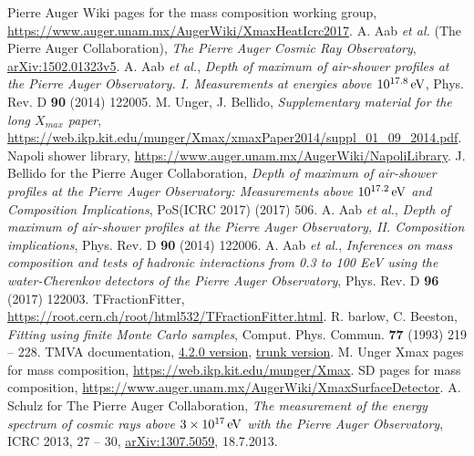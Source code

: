 \documentclass[12pt,a4paper]{report}
\begin{document}
\pagebreak
\titleformat{\chapter}[hang]{\normalfont\bf}{}{12pt}{\Large}
\begin{thebibliography}{50} 
\raggedright
{} Pierre Auger Wiki pages for the mass composition working group, \href{https://www.auger.unam.mx/AugerWiki/XmaxHeatIcrc2017}{https://www.auger.unam.mx/AugerWiki/XmaxHeatIcrc2017}.
 A. Aab \emph{et al.} (The Pierre Auger Collaboration), \emph{The Pierre Auger Cosmic Ray Observatory}, \href{http://arxiv.org/pdf/1502.01323.pdf}{arXiv:1502.01323v5}.
 A. Aab \emph{et al.}, \emph{Depth of maximum of air-shower profiles at the Pierre Auger Observatory. I. Measurements at energies above $\unit[10^{17.8}]{eV}$}, Phys. Rev. D \textbf{90} (2014) 122005.
 M. Unger, J. Bellido, \emph{Supplementary material for the long $X_{max}$ paper}, \href{https://web.ikp.kit.edu/munger/Xmax/xmaxPaper2014/suppl\_01\_09\_2014.pdf}{https://web.ikp.kit.edu/munger/Xmax/xmaxPaper2014/suppl\_01\_09\_2014.pdf}.
 Napoli shower library, \href{https://www.auger.unam.mx/AugerWiki/NapoliLibrary}{https://www.auger.unam.mx/AugerWiki/NapoliLibrary}.
 J. Bellido for the Pierre Auger Collaboration, \emph{Depth of maximum of air-shower profiles at the Pierre Auger Observatory: Measurements above $\unit[10^{17.2}]{eV}$ and Composition Implications}, PoS(ICRC 2017) (2017) 506.
 A. Aab \emph{et al.}, \emph{Depth of maximum of air-shower profiles at the Pierre Auger Observatory, II. Composition implications}, Phys. Rev. D \textbf{90} (2014) 122006.
 A. Aab \emph{et al.}, \emph{Inferences on mass composition and tests of hadronic interactions from 0.3 to 100 EeV using the water-Cherenkov detectors of the Pierre Auger Observatory}, Phys. Rev. D \textbf{96} (2017) 122003.
 TFractionFitter, \href{https://root.cern.ch/root/html532/TFractionFitter.html}{https://root.cern.ch/root/html532/TFractionFitter.html}.
 R. barlow, C. Beeston, \emph{Fitting using finite Monte Carlo samples}, Comput. Phys. Commun. \textbf{77} (1993) 219 -- 228.
 TMVA documentation, \href{https://root.cern.ch/download/doc/tmva/TMVAUsersGuide.pdf}{4.2.0 version}, \href{https://github.com/root-project/root/blob/master/documentation/tmva/UsersGuide/TMVAUsersGuide.pdf}{trunk version}.
 M. Unger Xmax pages for mass composition, \href{https://web.ikp.kit.edu/munger/Xmax}{https://web.ikp.kit.edu/munger/Xmax}.
 SD pages for mass composition, \href{https://www.auger.unam.mx/AugerWiki/XmaxSurfaceDetector}{https://www.auger.unam.mx/AugerWiki/XmaxSurfaceDetector}.
 A. Schulz for The Pierre Auger Collaboration, \emph{The measurement of the energy spectrum of cosmic rays above $\unit[3\times 10^{17}]{eV}$ with the Pierre Auger Observatory}, ICRC 2013, 27 -- 30, \href{https://arxiv.org/pdf/1307.5059.pdf}{arXiv:1307.5059}, 18.7.2013.
\end{thebibliography}
\end{document}
